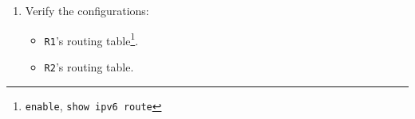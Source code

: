 \documentclass[pdftex,12pt,a4paper]{article}
\begin{document}
\begin{enumerate}
\begin{itemize}
\begin{itemize}
                                    \item Nexthop: \texttt{FD00:12::2}
                                \end{itemize}
                            \item \texttt{R2}'s routing table: 
                                \begin{itemize}
                                    \item IPv6 Network IP: \texttt{FD00:1::}
                                    \item IPv6 Netmask: 64 bits
                                    \item Nexthop: \texttt{FD00:12::1}
                                \end{itemize}
                            \item \texttt{PC1}'s routing table (a default route
                                entry): 
                                \begin{itemize}
                                    \item IPv6 Network IP: \texttt{::}
                                    \item IPv6 Netmask: 0 bits
                                    \item Nexthop: \texttt{FD00:1::1}
                                \end{itemize}
                            \item \texttt{PC2}'s routing table (a default route
                                entry): 
                                \begin{itemize}
                                    \item IPv6 Network IP: \texttt{::}
                                    \item IPv6 Netmask: 0 bits
                                    \item Nexthop: \texttt{FD00:2::1}
                                \end{itemize}
                        \end{itemize}
                    \item Verify the configurations:
                        \begin{itemize}
                            \item \texttt{R1}'s routing
                                table\footnote{\texttt{enable}, \texttt{show ipv6
                                route}}.
                            \item \texttt{R2}'s routing table.

\end{itemize}
\end{enumerate}
\end{document}
